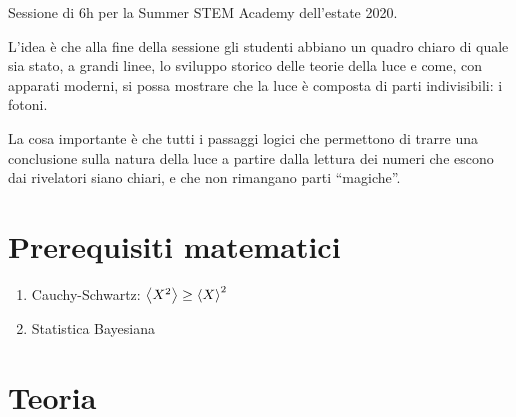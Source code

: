 \documentclass[main.tex]{subfiles}
\begin{document}
Sessione di 6h per la Summer STEM Academy dell'estate 2020. 

L'idea è che alla fine della sessione gli studenti abbiano un quadro chiaro di quale sia stato, a grandi linee, lo sviluppo storico delle teorie della luce e come, con apparati moderni, si possa mostrare che la luce è composta di parti indivisibili: i fotoni. 

La cosa importante è che tutti i passaggi logici che permettono di trarre una conclusione sulla natura della luce a partire dalla lettura dei numeri che escono dai rivelatori siano chiari, e che non rimangano parti ``magiche''. 

\section{Prerequisiti matematici}

\begin{enumerate}
    \item Cauchy-Schwartz: \(\expval{X^2} \geq \expval{X}^2 \)
    \item Statistica Bayesiana
\end{enumerate}

\section{Teoria}
\end{document}
